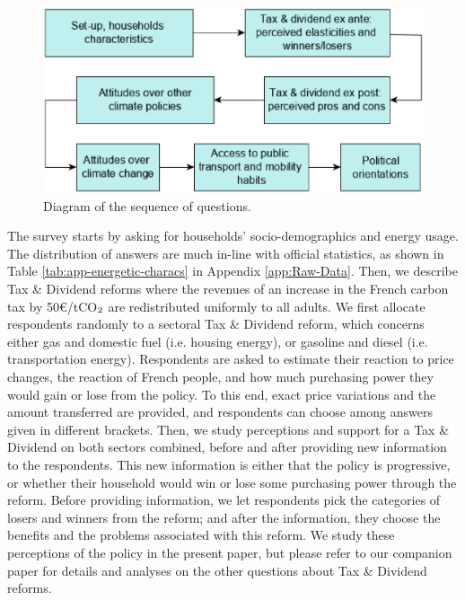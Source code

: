 \documentclass[english,5p,authoryear]{elsarticle}
\begin{document}
\begin{figure}[!htbp]
\centering
\includegraphics[width=\columnwidth]{Images_EPS/diagram_survey_attitudes.eps}
\caption{Diagram of the sequence of questions.}
\label{fig:survey}
\end{figure}
%
%
%
The survey starts by asking for households' socio-demographics and energy usage. The distribution of answers are much in-line with official statistics, as shown in Table \ref{tab:app-energetic-characs} in Appendix \ref{app:Raw-Data}. Then, we describe Tax \& Dividend reforms where the revenues of an increase in the French carbon tax by 50\euro{}/tCO$_\textnormal{2}$ are redistributed uniformly to all adults. We first allocate respondents randomly to a sectoral Tax \& Dividend reform, which concerns either gas and domestic fuel (i.e. housing energy), or gasoline and diesel (i.e. transportation energy). Respondents are asked to estimate their reaction to price changes, the reaction of French people, and how much purchasing power they would gain or lose from the policy. To this end, exact price variations and the amount transferred are provided, and respondents can choose among answers given in different brackets. Then, we study perceptions and support for a Tax \& Dividend on both sectors combined, before and after providing new information to the respondents. This new information is either that the policy is progressive, or whether their household would win or lose some purchasing power through the reform. Before providing information, we let respondents pick the categories of losers and winners from the reform; and after the information, they choose the benefits and the problems associated with this reform. We study these perceptions of the policy in the present paper, but please refer to our companion paper \citep{douenne_can_2019} for details and analyses on the other questions about Tax \& Dividend reforms. %

%
\end{document}
